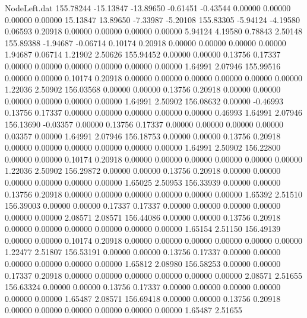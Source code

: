 \begin{filecontents}{NodeLeft.dat}
 155.78244  -15.13847  -13.89650    -0.61451   -0.43544    0.00000    0.00000    0.00000    0.00000   15.13847   13.89650   -7.33987   -5.20108
 155.83305   -5.94124   -4.19580     0.06593    0.20918    0.00000    0.00000    0.00000    0.00000    5.94124    4.19580    0.78843    2.50148
 155.89388   -1.94687   -0.06714     0.10174    0.20918    0.00000    0.00000    0.00000    0.00000    1.94687    0.06714    1.21902    2.50626
 155.94452    0.00000    0.00000     0.13756    0.17337    0.00000    0.00000    0.00000    0.00000    0.00000    0.00000    1.64991    2.07946
 155.99516    0.00000    0.00000     0.10174    0.20918    0.00000    0.00000    0.00000    0.00000    0.00000    0.00000    1.22036    2.50902
 156.03568    0.00000    0.00000     0.13756    0.20918    0.00000    0.00000    0.00000    0.00000    0.00000    0.00000    1.64991    2.50902
 156.08632    0.00000   -0.46993     0.13756    0.17337    0.00000    0.00000    0.00000    0.00000    0.00000    0.46993    1.64991    2.07946
 156.13690   -0.03357    0.00000     0.13756    0.17337    0.00000    0.00000    0.00000    0.00000    0.03357    0.00000    1.64991    2.07946
 156.18753    0.00000    0.00000     0.13756    0.20918    0.00000    0.00000    0.00000    0.00000    0.00000    0.00000    1.64991    2.50902
 156.22800    0.00000    0.00000     0.10174    0.20918    0.00000    0.00000    0.00000    0.00000    0.00000    0.00000    1.22036    2.50902
 156.29872    0.00000    0.00000     0.13756    0.20918    0.00000    0.00000    0.00000    0.00000    0.00000    0.00000    1.65025    2.50953
 156.33939    0.00000    0.00000     0.13756    0.20918    0.00000    0.00000    0.00000    0.00000    0.00000    0.00000    1.65392    2.51510
 156.39003    0.00000    0.00000     0.17337    0.17337    0.00000    0.00000    0.00000    0.00000    0.00000    0.00000    2.08571    2.08571
 156.44086    0.00000    0.00000     0.13756    0.20918    0.00000    0.00000    0.00000    0.00000    0.00000    0.00000    1.65154    2.51150
 156.49139    0.00000    0.00000     0.10174    0.20918    0.00000    0.00000    0.00000    0.00000    0.00000    0.00000    1.22477    2.51807
 156.53191    0.00000    0.00000     0.13756    0.17337    0.00000    0.00000    0.00000    0.00000    0.00000    0.00000    1.65812    2.08980
 156.58253    0.00000    0.00000     0.17337    0.20918    0.00000    0.00000    0.00000    0.00000    0.00000    0.00000    2.08571    2.51655
 156.63324    0.00000    0.00000     0.13756    0.17337    0.00000    0.00000    0.00000    0.00000    0.00000    0.00000    1.65487    2.08571
 156.69418    0.00000    0.00000     0.13756    0.20918    0.00000    0.00000    0.00000    0.00000    0.00000    0.00000    1.65487    2.51655

\end{filecontents}
